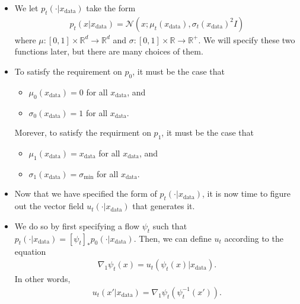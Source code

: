 \documentclass[10pt]{article}
\newcommand{\ra}{\rightarrow}
\newcommand{\mcal}[1]{\mathcal{#1}}
\newcommand{\Real}{\mathbb{R}}
\newcommand{\data}{\mathrm{data}}
\begin{document}
\begin{itemize}
  \item We let $p_t(\cdot|x_{\data})$ take the form
  \begin{align}
    p_t(x|x_{\data}) = \mcal{N}(x;\mu_t(x_{\data}), \sigma_t(x_{\data})^2 I) \label{eqn:mu-sigma}
  \end{align}
  where $\mu: [0,1] \times \Real^d \ra \Real^d$ and $\sigma: [0,1] \times \Real \ra \Real^{+}.$ We will specify these two functions later, but there are many choices of them.

  \item To satisfy the requirement on $p_0$, it must be the case that
  \begin{itemize}
    \item $\mu_0(x_{\data}) = 0$ for all $x_{\data}$, and
    \item $\sigma_0(x_{\data}) = 1$ for all $x_{\data}$.
  \end{itemize}
  Morever, to satisfy the requirment on $p_1$, it must be the case that
  \begin{itemize}
    \item $\mu_1(x_{\data}) = x_{\data}$ for all $x_{\data}$, and
    \item $\sigma_1(x_{\data}) = \sigma_{\min}$ for all $x_{\data}$.
  \end{itemize}

  \item Now that we have specified the form of $p_t(\cdot|x_{\data})$, it is now time to figure out the vector field $u_t(\cdot|x_{\data})$ that generates it. 
  
  \item We do so by first specifying a flow $\psi_t$ such that $p_t(\cdot|x_{\data}) = [\psi_t]_* p_0(\cdot|x_{\data})$. Then, we can define $u_t$ according to the equation
  \begin{align*}
    \nabla_1 \psi_t(x) = u_t(\psi_t(x)| x_{\data}).
  \end{align*}
  In other words,
  \begin{align}
    u_t(x'| x_{\data}) = \nabla_1 \psi_t(\psi_t^{-1}(x')). \label{eqn:single-item-vector-field}
  \end{align}


\end{itemize}
\end{document}
